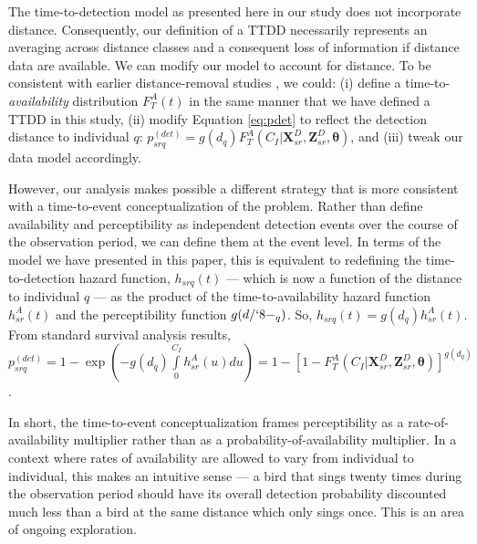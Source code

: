 \documentclass[useAMS,usenatbib,referee,12pt]{article}
\begin{document}
The time-to-detection model as presented here in our study does not incorporate distance.  Consequently, our definition of a TTDD necessarily represents an averaging across distance classes and a consequent loss of information if distance data are available.  We can modify our model to account for distance.  To be consistent with earlier distance-removal studies \citep{Farnsworth2005, Amundson2014}, we could: (i) define a time-to-\textit{availability} distribution $F_T^A(t)$ in the same manner that we have defined a TTDD in this study, (ii) modify Equation \ref{eq:pdet} to reflect the detection distance to individual $q$: $p_{srq}^{(det)} = g(d_q) F_T^A(C_I|\textbf{X}_{sr}^D, \textbf{Z}_{sr}^D, \boldsymbol{\theta})$, and (iii) tweak our data model accordingly.

However, our analysis makes possible a different strategy that is more consistent with a time-to-event conceptualization of the problem.  Rather than define availability and perceptibility as independent detection events over the course of the observation period, we can define them at the event level.  In terms of the model we have presented in this paper, this is equivalent to redefining the time-to-detection hazard function, $h_{srq}(t)$ --- which is now a function of the distance to individual $q$ --- as the product of the time-to-availability hazard function $h_{sr}^A(t)$ and the perceptibility function $g(d/`8-_q)$.  So, $h_{srq}(t) = g(d_q) h_{sr}^A(t)$.  From standard survival analysis results, $p_{srq}^{(det)} = 1 - \exp\left(-g(d_q)\int\limits_0^{C_I} h_{sr}^A(u)du\right) = 1 - \left[1 - F_T^A(C_I|\textbf{X}_{sr}^D, \textbf{Z}_{sr}^D, \boldsymbol{\theta}) \right]^{g(d_q)}$.

In short, the time-to-event conceptualization frames perceptibility as a rate-of-availability multiplier rather than as a probability-of-availability multiplier.  In a context where rates of availability are allowed to vary from individual to individual, this makes an intuitive sense --- a bird that sings twenty times during the observation period should have its overall detection probability discounted much less than a bird at the same distance which only sings once.  This is an area of ongoing exploration.


\end{document}
